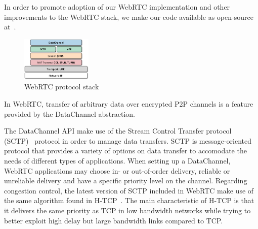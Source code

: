 \documentclass{sig-alternate}
\begin{document}
In order to promote adoption of our WebRTC implementation and other improvements to the
WebRTC stack, we make our code available as open-source at~\cite{webrtc-utp}.





\begin{figure}[t]
  \centering
    \includegraphics[width=0.30\textwidth]{figs/architecture3}
\vspace*{-0.38cm}
	\caption{WebRTC protocol stack} \label{fig:architecture}
\vspace*{-0.4cm}
\end{figure}



In WebRTC, transfer of arbitrary data over encrypted P2P channels is a feature provided by
the DataChannel abstraction. 



The DataChannel API make use of the Stream Control Transfer protocol (SCTP)~\cite{sctp}
protocol in order to manage data transfers. SCTP is message-oriented protocol that
provides a variety of options on data transfer to accomodate the needs of different types
of applications. When setting up a DataChannel, WebRTC applications may choose in- or
out-of-order delivery, reliable or unreliable delivery and have a specific priority level
on the channel. Regarding congestion control, the latest version of SCTP included in
WebRTC make use of the same algorithm found in H-TCP~\cite{htcp}. The main characteristic
of H-TCP is that it delivers the same priority as TCP in low bandwidth networks while
trying to better exploit high delay but large bandwidth links compared to TCP.
\end{document}
